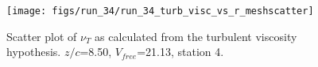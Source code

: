 \begin{figure}[H]
\centering
\texttt{[image: figs/run\_34/run\_34\_turb\_visc\_vs\_r\_meshscatter]}
\caption{Scatter plot of $\nu_T$ as calculated from the turbulent viscosity hypothesis. $z/c$=8.50, $V_{free}$=21.13, station 4.}
\label{fig:run_34_turb_visc_vs_r_meshscatter}
\end{figure}


